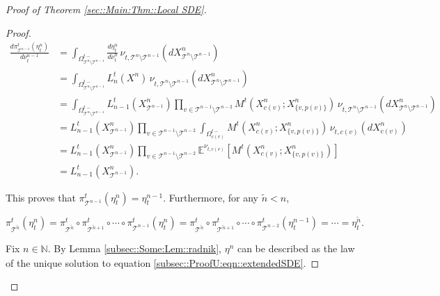 \documentclass[12pt]{article}
\newcommand{\mb}{\mathbb}
\newcommand{\mc}{\mathcal}
\newcommand{\ind}{\hspace{24pt}}
\newcommand{\exmu}[2]{\mb{E}^{#1}\left[#2\right]}	%
\renewcommand{\v}{v}							%
\newcommand{\OmegaV}[2]{\Omega_{#1}^{#2}}		%
\renewcommand{\t}{t}							%
\newcommand{\pup}[1]{^{#1}}							%
\newcommand{\tree}{\mc{T}}							%
\newcommand{\numb}{n}								%
\newcommand{\piV}[2]{\pi_{#1}^{#2}}					%
\newcommand{\rxvtsn}[3]{X_{#1}^{#3}{#2}}			%
\newcommand{\mm}[3]{\nu_{#2#1}^{#3}}						%
\newcommand{\mmm}[3]{\eta_{#2#1}^{#3}}						%
\newcommand{\alt}{\widetilde}						%
\newcommand{\dense}[2]{L_{#1}^{#2}}				%
\newcommand{\cdense}[2]{M_{#1}^{#2}}			%
\renewcommand{\c}[1]{c(#1)}						%
\newcommand{\p}[1]{p(#1)}						%
\begin{document}
\begin{proof}[Proof of Theorem \ref{sec::Main:Thm::Local SDE}]
\begin{proof}
\begin{align*}
\frac{d\piV{\tree\pup{\numb-1}}{\t}(\mmm{}{\t}{\numb})}{d\mm{}{\t}{\numb-1}} &= \int_{\OmegaV{\tree\pup{\numb}\setminus\tree\pup{\numb-1}}{\t-}} \frac{d\mmm{}{\t}{\numb}}{d\mm{}{\t}{\numb}}\,\mm{\tree\pup{\numb}\setminus\tree\pup{\numb-1}}{\t,}{}(d\rxvtsn{\tree\pup{\numb}\setminus\tree\pup{\numb-1}}{}{\numb})\\
&=\int_{\OmegaV{\tree\pup{\numb}\setminus\tree\pup{\numb-1}}{\t-}} \dense{\numb}{\t}(\rxvtsn{}{}{\numb})\,\mm{\tree\pup{\numb}\setminus\tree\pup{\numb-1}}{\t,}{}(d\rxvtsn{\tree\pup{\numb}\setminus\tree\pup{\numb-1}}{}{\numb})\\
&= \int_{\OmegaV{\tree\pup{\numb}\setminus\tree\pup{\numb-1}}{\t-}} \dense{\numb-1}{\t}(\rxvtsn{\tree\pup{\numb-1}}{}{\numb})\prod_{\v\in \tree\pup{\numb-1}\setminus\tree\pup{\numb-2}} \cdense{}{\t}(\rxvtsn{\c{\v}}{}{\numb};\rxvtsn{\{v,\p{\v}\}}{}{\numb})\,\mm{\tree\pup{\numb}\setminus\tree\pup{\numb-1}}{\t,}{}(d\rxvtsn{\tree\pup{\numb}\setminus\tree\pup{\numb-1}}{}{\numb})\\
&= \dense{\numb-1}{\t}(\rxvtsn{\tree\pup{\numb-1}}{}{\numb})\prod_{\v\in \tree\pup{\numb-1}\setminus\tree\pup{\numb-2}}\int_{\OmegaV{\c{\v}}{\t-}} \cdense{}{\t}(\rxvtsn{\c{\v}}{}{\numb};\rxvtsn{\{v,\p{\v}\}}{}{\numb})\,\mm{\c{\v}}{\t,}{}(d\rxvtsn{\c{\v}}{}{\numb})\\
&= \dense{\numb-1}{\t}(\rxvtsn{\tree\pup{\numb-1}}{}{\numb})\prod_{\v\in \tree\pup{\numb-1}\setminus\tree\pup{\numb-2}}\exmu{\mm{\c{\v}}{\t,}{}}{\cdense{}{\t}(\rxvtsn{\c{\v}}{}{\numb};\rxvtsn{\{v,\p{\v}\}}{}{\numb})}\\
&= \dense{\numb-1}{\t}(\rxvtsn{\tree\pup{\numb-1}}{}{\numb}).
\end{align*}

This proves that \(\piV{\tree\pup{\numb-1}}{\t}(\mmm{}{\t}{\numb}) = \mmm{}{\t}{\numb-1}\). Furthermore, for any \(\alt{\numb} < \numb\),

\[\piV{\tree\pup{\alt{\numb}}}{\t}(\mmm{}{\t}{\numb}) = \piV{\tree\pup{\alt\numb}}{\t}\circ\piV{\tree\pup{\alt{\numb} + 1}}{\t} \circ\cdots\circ \piV{\tree\pup{\numb-1}}{\t}(\mmm{}{\t}{\numb}) = \piV{\tree\pup{\alt\numb}}{\t}\circ\piV{\tree\pup{\alt{\numb} + 1}}{\t} \circ\cdots\circ \piV{\tree\pup{\numb-2}}{\t}(\mmm{}{\t}{\numb-1}) = \cdots = \mmm{}{\t}{\alt{\numb}}.\]

\ind Fix \(\numb\in\mb{N}\). By Lemma \ref{subsec::Some:Lem::radnik}, \(\mmm{}{}{\numb}\) can be described as the law of the unique solution to equation \eqref{subsec::ProofU:eqn::extendedSDE}.
\end{proof}


\end{proof}
\end{document}
